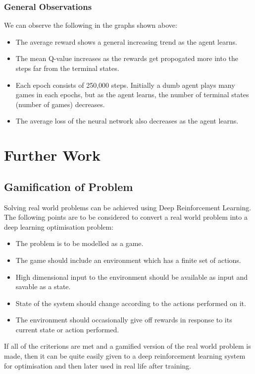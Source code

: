 \documentclass[a4paper,12pt]{report}
\begin{document}
			\subsection{General Observations}
				We can observe the following in the graphs shown above:
				\begin{itemize}
				\item The average reward shows a general increasing trend as the agent learns.
				\item The mean Q-value increases as the rewards get propogated more into the steps far from the terminal states.
				\item Each epoch consists of 250,000 steps. Initially a dumb agent plays many games in each epochs, but as the agent learns, the number of terminal states (number of games) decreases.
				\item The average loss of the neural network also decreases as the agent learns.
		\end{itemize}


	\chapter{Further Work}
		\section{Gamification of Problem}
			Solving real world problems can be achieved using Deep Reinforcement Learning. The following points are to be considered to convert a real world problem into a deep learning optimisation problem:
			\begin{itemize}
				\setlength\itemsep{0em}
				\item The problem is to be modelled as a game.
				\item The game should include an environment which has a finite set of actions.
				\item High dimensional input to the environment should be available as input and savable as a state.
				\item State of the system should change according to the actions performed on it.
				\item The environment should occasionally give off rewards in response to its current state or action performed.
			\end{itemize}

			If all of the criterions are met and a gamified version of the real world problem is made, then it can be quite easily given to a deep reinforcement learning system for optimisation and then later used in real life after training.
\end{document}
